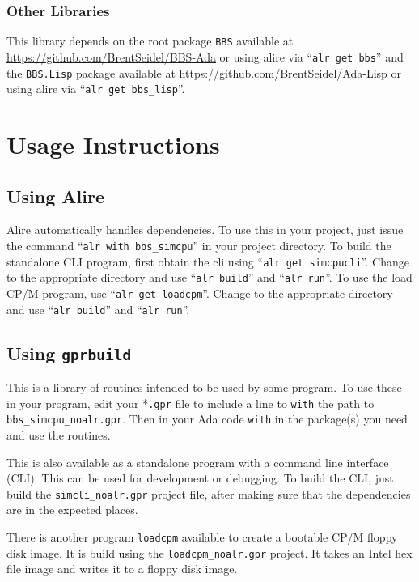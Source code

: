 \documentclass[10pt, openany]{book}
\newcommand{\package}[1]{\texttt{#1}}
\newcommand{\keyword}[1]{\texttt{#1}}
\begin{document}
\subsection{Other Libraries}
This library depends on the root package \package{BBS} available at \url{https://github.com/BrentSeidel/BBS-Ada} or using alire via ``\keyword{alr get bbs}'' and the \package{BBS.Lisp} package available at \url{https://github.com/BrentSeidel/Ada-Lisp} or using alire via ``\keyword{alr get bbs\_lisp}''.

\chapter{Usage Instructions}

\section{Using Alire}
Alire automatically handles dependencies.
To use this in your project, just issue the command ``\keyword{alr with bbs\_simcpu}'' in your project directory.
To build the standalone CLI program, first obtain the cli using ``\keyword{alr get simcpucli}''.
Change to the appropriate directory and use ``\keyword{alr build}'' and ``\keyword{alr run}''.
To use the load CP/M program, use ``\keyword{alr get loadcpm}''.
Change to the appropriate directory and use ``\keyword{alr build}'' and ``\keyword{alr run}''.

\section{Using \keyword{gprbuild}}
This is a library of routines intended to be used by some program.
To use these in your program, edit your *\keyword{.gpr} file to include a line to \keyword{with} the path to \keyword{bbs\_simcpu\_noalr.gpr}.
Then in your Ada code \keyword{with} in the package(s) you need and use the routines.

This is also available as a standalone program with a command line interface (CLI).
This can be used for development or debugging.
To build the CLI, just build the \keyword{simcli\_noalr.gpr} project file, after making sure that the dependencies are in the expected places.

There is another program \keyword{loadcpm} available to create a bootable CP/M floppy disk image.
It is build using the \keyword{loadcpm\_noalr.gpr} project.
It takes an Intel hex file image and writes it to a floppy disk image.
\end{document}
